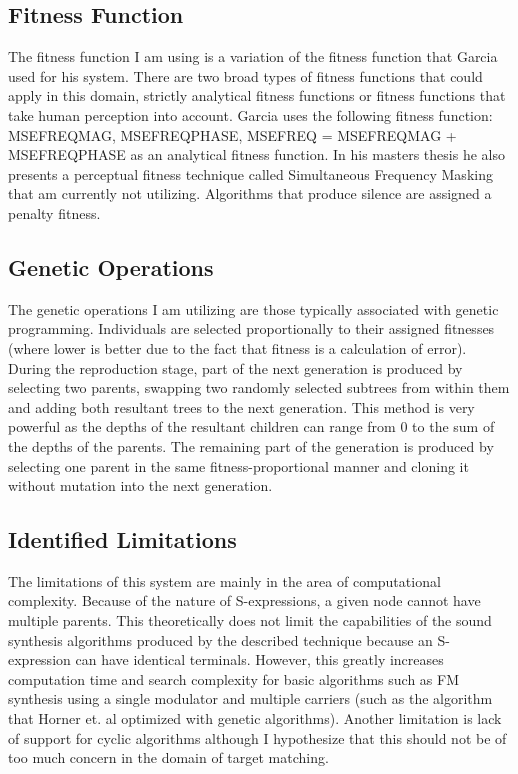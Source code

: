 \documentclass[12pt]{article}
\begin{document}
\subsection{Fitness Function}
The fitness function I am using is a variation of the fitness function that Garcia used for his system. There are two broad types of fitness functions that could apply in this domain, strictly analytical fitness functions or fitness functions that take human perception into account. Garcia uses the following fitness function: MSEFREQMAG, MSEFREQPHASE, MSEFREQ = MSEFREQMAG + MSEFREQPHASE as an analytical fitness function. In his masters thesis he also presents a perceptual fitness technique called Simultaneous Frequency Masking that am currently not utilizing. Algorithms that produce silence are assigned a penalty fitness.
\subsection{Genetic Operations}
The genetic operations I am utilizing are those typically associated with genetic programming. Individuals are selected proportionally to their assigned fitnesses (where lower is better due to the fact that fitness is a calculation of error). During the reproduction stage, part of the next generation is produced by selecting two parents, swapping two randomly selected subtrees from within them and adding both resultant trees to the next generation. This method is very powerful as the depths of the resultant children can range from 0 to the sum of the depths of the parents. The remaining part of the generation is produced by selecting one parent in the same fitness-proportional manner and cloning it without mutation into the next generation.
\subsection{Identified Limitations}
The limitations of this system are mainly in the area of computational complexity. Because of the nature of S-expressions, a given node cannot have multiple parents. This theoretically does not limit the capabilities of the sound synthesis algorithms produced by the described technique because an S-expression can have identical terminals. However, this greatly increases computation time and search complexity for basic algorithms such as FM synthesis using a single modulator and multiple carriers (such as the algorithm that Horner et. al optimized with genetic algorithms). Another limitation is lack of support for cyclic algorithms although I hypothesize that this should not be of too much concern in the domain of target matching.
\end{document}
